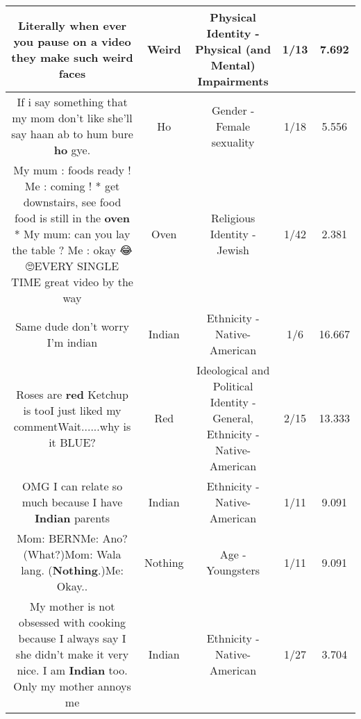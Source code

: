 \documentclass[11pt]{article}
\newlength\mylength
\begin{document}
\begin{center}
\begin{longtable}{|C{.65\mylength}|C{.30\mylength}|C{.12\mylength}|C{.12\mylength}|C{.12\mylength}|}
  \small Literally when ever you pause on a video they make such \textbf{weird} faces\normalsize   & Weird & Physical Identity - Physical (and Mental) Impairments & 1/13 & 7.692 \\  \hline
  \small If i say something that my mom don't like she'll say haan ab to hum bure \textbf{ho} gye.\normalsize   & Ho & Gender - Female sexuality & 1/18 & 5.556 \\  \hline
  \small My mum : foods ready ! Me : coming ! * get downstairs, see food food is still in  the \textbf{oven} * My mum: can you lay the table ? Me : okay 😂🙄EVERY SINGLE TIME great video by the way\normalsize   & Oven & Religious Identity - Jewish & 1/42 & 2.381 \\  \hline
  \small Same dude don't worry I'm indian\normalsize   & Indian & Ethnicity - Native-American & 1/6 & 16.667 \\  \hline
  \small Roses are \textbf{r\textbf{ed}} Ketchup is tooI just liked my commentWait......why is it BLUE?\normalsize   & Red &  Ideological and Political Identity - General, Ethnicity - Native-American & 2/15 & 13.333 \\  \hline
  \small OMG I can relate so much because I have \textbf{Indian} parents\normalsize   & Indian & Ethnicity - Native-American & 1/11 & 9.091 \\  \hline
  \small Mom: BERNMe: Ano? (What?)Mom: Wala lang. (\textbf{Nothing}.)Me: Okay..\normalsize   & Nothing & Age - Youngsters & 1/11 & 9.091 \\  \hline
  \small My mother is not obsessed with cooking because I always say I she didn't make it very nice. I am \textbf{Indian} too. Only my mother annoys me\normalsize   & Indian & Ethnicity - Native-American & 1/27 & 3.704 \\  \hline

\end{longtable}
\end{center}
\end{document}
